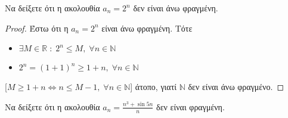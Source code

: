 \begin{enumerate}

    \item Να δείξετε ότι η ακολουθία $ a_{n} = 2^{n} $ δεν είναι άνω 
        φραγμένη.

        \begin{proof}
        \item {} 
            Έστω ότι η $ a_{n}=2^{n} $ είναι άνω φραγμένη. Τότε 

            \begin{minipage}{0.35\textwidth}
                \begin{itemize}
                    \item $ \exists M \in \mathbb{R} \; : \; 2^{n} \leq M, \; 
                        \forall n \in \mathbb{N} $ \hfill {}
                    \item $ 2^{n}=(1+1)^{n} \geq 1+n, \; \forall n \in 
                        \mathbb{N} $ \hfill {}
                \end{itemize}    
            \end{minipage}

            [$ M \geq 1+n \Leftrightarrow n \leq M-1, \; 
            \forall n \in \mathbb{N} $] 
            άτοπο, γιατί $ \mathbb{N} $ δεν είναι άνω φραγμένο.
        \end{proof}

    \item Να δείξετε ότι η ακολουθία $ a_{n} = \frac{n^{3} + \sin{5n}}{n} $ 
        δεν είναι φραγμένη.


\end{enumerate}

